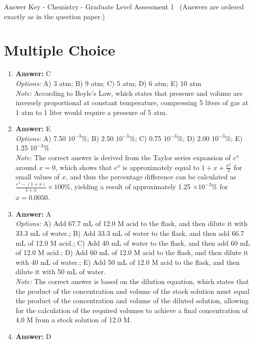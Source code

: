 \documentclass[12pt]{article}
\begin{document}
\begin{center}
Answer Key - Chemistry - Graduate Level Assessment 1 \
\small (Answers are ordered exactly as in the question paper.)
\end{center}

\section*{Multiple Choice}
\begin{enumerate}[label=\arabic*.]
\item \textbf{Answer:} C
\\ \textit{Options:} A) 3 atm; B) 9 atm; C) 5 atm; D) 6 atm; E) 10 atm
\\ \textit{Note:} According to Boyle's Law, which states that pressure and volume are inversely proportional at constant temperature, compressing 5 liters of gas at 1 atm to 1 liter would require a pressure of 5 atm.
\item \textbf{Answer:} E
\\ \textit{Options:} A) 7.50 $10^{-3} \%$; B) 2.50 $10^{-3} \%$; C) 0.75 $10^{-3} \%$; D) 2.00 $10^{-3} \%$; E) 1.25 $10^{-3} \%$
\\ \textit{Note:} The correct answer is derived from the Taylor series expansion of \( e^x \) around \( x=0 \), which shows that \( e^x \) is approximately equal to \( 1 + x + \frac{x^2}{2} \) for small values of \( x \), and thus the percentage difference can be calculated as \( \frac{e^x - (1+x)}{1+x} \times 100\% \), yielding a result of approximately 1.25 \( \times 10^{-3} \% \) for \( x=0.0050 \).
\item \textbf{Answer:} A
\\ \textit{Options:} A) Add 67.7 mL of 12.0 M acid to the flask, and then dilute it with 33.3 mL of water.; B) Add 33.3 mL of water to the flask, and then add 66.7 mL of 12.0 M acid.; C) Add 40 mL of water to the flask, and then add 60 mL of 12.0 M acid.; D) Add 60 mL of 12.0 M acid to the flask, and then dilute it with 40 mL of water.; E) Add 50 mL of 12.0 M acid to the flask, and then dilute it with 50 mL of water.
\\ \textit{Note:} The correct answer is based on the dilution equation, which states that the product of the concentration and volume of the stock solution must equal the product of the concentration and volume of the diluted solution, allowing for the calculation of the required volumes to achieve a final concentration of 4.0 M from a stock solution of 12.0 M.
\item \textbf{Answer:} D

\end{enumerate}
\end{document}
